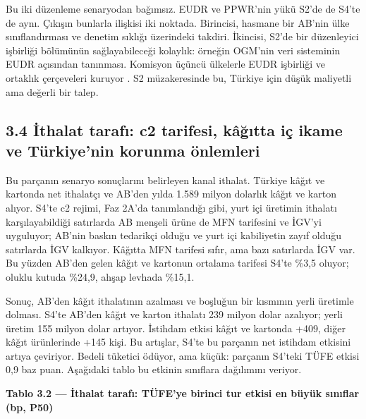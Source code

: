 Bu iki düzenleme senaryodan bağımsız. EUDR ve PPWR'nin yükü S2'de de S4'te de aynı. Çıkışın bunlarla ilişkisi iki noktada. Birincisi, hasmane bir AB'nin ülke sınıflandırması ve denetim sıklığı üzerindeki takdiri. İkincisi, S2'de bir düzenleyici işbirliği bölümünün sağlayabileceği kolaylık: örneğin OGM'nin veri sisteminin EUDR açısından tanınması. Komisyon üçüncü ülkelerle EUDR işbirliği ve ortaklık çerçeveleri kuruyor \etiketV{}. S2 müzakeresinde bu, Türkiye için düşük maliyetli ama değerli bir talep.

\hypertarget{nace_kartlar_16-18-34-iux307thalat-tarafux131-c2-tarifesi-kuxe2ux11fux131tta-iuxe7-ikame-ve-tuxfcrkiyenin-korunma-uxf6nlemleri}{%
\subsection{3.4 İthalat tarafı: c2 tarifesi, kâğıtta iç ikame ve Türkiye'nin korunma önlemleri}\label{nace_kartlar_16-18-34-iux307thalat-tarafux131-c2-tarifesi-kuxe2ux11fux131tta-iuxe7-ikame-ve-tuxfcrkiyenin-korunma-uxf6nlemleri}}

Bu parçanın senaryo sonuçlarını belirleyen kanal ithalat. Türkiye kâğıt ve kartonda net ithalatçı ve AB'den yılda 1.589 milyon dolarlık kâğıt ve karton alıyor. S4'te c2 rejimi, Faz 2A'da tanımlandığı gibi, yurt içi üretimin ithalatı karşılayabildiği satırlarda AB menşeli ürüne de MFN tarifesini ve İGV'yi uyguluyor; AB'nin baskın tedarikçi olduğu ve yurt içi kabiliyetin zayıf olduğu satırlarda İGV kalkıyor. Kâğıtta MFN tarifesi sıfır, ama bazı satırlarda İGV var. Bu yüzden AB'den gelen kâğıt ve kartonun ortalama tarifesi S4'te \%3,5 oluyor; oluklu kutuda \%24,9, ahşap levhada \%15,1.

Sonuç, AB'den kâğıt ithalatının azalması ve boşluğun bir kısmının yerli üretimle dolması. S4'te AB'den kâğıt ve karton ithalatı 239 milyon dolar azalıyor; yerli üretim 155 milyon dolar artıyor. İstihdam etkisi kâğıt ve kartonda +409, diğer kâğıt ürünlerinde +145 kişi. Bu artışlar, S4'te bu parçanın net istihdam etkisini artıya çeviriyor. Bedeli tüketici ödüyor, ama küçük: parçanın S4'teki TÜFE etkisi 0,9 baz puan. Aşağıdaki tablo bu etkinin sınıflara dağılımını veriyor.


\textbf{Tablo 3.2 --- İthalat tarafı: TÜFE'ye birinci tur etkisi en büyük sınıflar (bp, P50)}

\nopagebreak[4]

\begingroup\gbtablo\footnotesize

